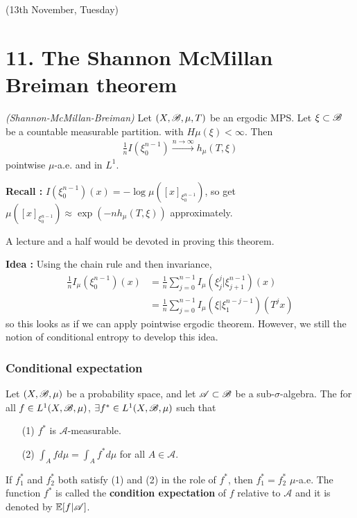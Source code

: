 \documentclass[12pt,a4paper]{report}
\newenvironment{proof}
{\begin{changemargin}{1cm}{0.5cm} 
	}%
	{\end{changemargin}
}
\begin{document}
\newday

(13th November, Tuesday)
\s

\section*{11. The Shannon McMillan Breiman theorem}

\thm \emph{(Shannon-McMillan-Breiman)} Let $(X, \mathscr{B}, \mu, T)$ be an ergodic MPS. Let $\xi \subset \mathscr{B}$ be a countable measurable partition. with $H\mu(\xi) < \infty$. Then
\begin{align*}
\frac{1}{n} I(\xi^{n-1}_0) \xrightarrow{n\rightarrow \infty} h_{\mu}(T,\xi) 
\end{align*}
pointwise $\mu$-a.e. and in $L^1$.
\s

\textbf{Recall :} $I(\xi_0^{n-1})(x) = -\log \mu([x]_{\xi_0^{n-1}})$, so get $\mu([x]_{\xi_0^{n-1}})\approx \exp( -n h_{\mu}(T,\xi))$ approximately.
\s

A lecture and a half would be devoted in proving this theorem.

\begin{proof}
\textbf{Idea :} Using the chain rule and then invariance,
\begin{align*}
\frac{1}{n} I_{\mu}(\xi^{n-1}_0)(x) &= \frac{1}{n} \sum_{j=0}^{n-1} I_{\mu}(\xi_j^j |\xi_{j+1}^{n-1})(x) \\
&= \frac{1}{n} \sum_{j=0}^{n-1} I_{\mu}(\xi | \xi_1^{n-j-1})(T^j x)
\end{align*}
so this looks as if we can apply pointwise ergodic theorem. However, we still the notion of conditional entropy to develop this idea.
\end{proof}

\subsubsection*{Conditional expectation}

Let $(X,\mathscr{B}, \mu)$ be a probability space, and let $\mathscr{A} \subset \mathscr{B}$ be a sub-$\sigma$-algebra. The for all $f\in L^1(X,\mathscr{B}, \mu)$, $\exists f^* \in L^1(X, \mathscr{B}, \mu)$ such that
\begin{itemize}
\item[(1)] $f^*$ is $\mathscr{A}$-measurable.
\item[(2)] $\int_A fd\mu = \int_A f^* d\mu$ for all $A \in \mathscr{A}$.
\end{itemize}
If $f_1^*$ and $f_2^*$ both satisfy (1) and (2) in the role of $f^*$, then $f_1^* = f_2^*$ $\mu$-a.e. The function $f^*$ is called the \textbf{condition expectation} of $f$ relative to $\mathscr{A}$ and it is denoted by $\mathbb{E}  [f| \mathscr{A}]$.
\s
\end{document}
